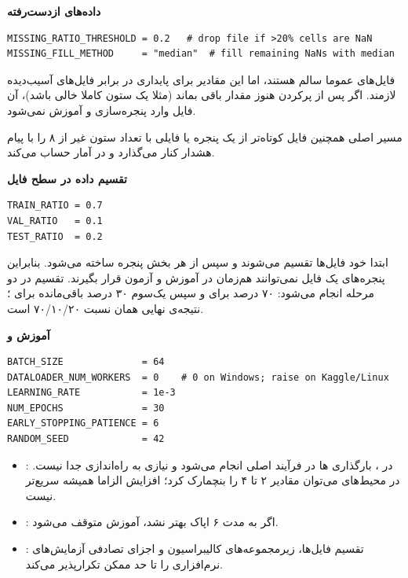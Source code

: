 \documentclass{article}
\newcommand{\mysubsection}[1]{
\par\vspace{0.5cm}
\noindent\textcolor{main_blue}{\large\textbf{#1}}
\par\vspace{0.2cm}
}
\begin{document}
\mysubsection{داده‌های ازدست‌رفته}

\begin{latin}
\begin{lstlisting}
MISSING_RATIO_THRESHOLD = 0.2   # drop file if >20% cells are NaN
MISSING_FILL_METHOD     = "median"  # fill remaining NaNs with median
\end{lstlisting}
\end{latin}

فایل‌های  عموما سالم هستند، اما این مقادیر برای پایداری در برابر فایل‌های آسیب‌دیده لازمند.
اگر پس از پرکردن هنوز مقدار  باقی بماند (مثلا یک ستون کاملا خالی باشد)،
آن فایل وارد پنجره‌سازی و آموزش نمی‌شود.

مسیر اصلی همچنین فایل کوتاه‌تر از یک پنجره یا فایلی با تعداد ستون غیر از ۸ را
با پیام هشدار کنار می‌گذارد و در آمار  حساب می‌کند.

\mysubsection{تقسیم داده در سطح فایل}

\begin{latin}
\begin{lstlisting}
TRAIN_RATIO = 0.7
VAL_RATIO   = 0.1
TEST_RATIO  = 0.2
\end{lstlisting}
\end{latin}

ابتدا خود فایل‌ها تقسیم می‌شوند و سپس از هر بخش پنجره ساخته می‌شود. بنابراین
پنجره‌های یک فایل نمی‌توانند هم‌زمان در آموزش و آزمون قرار بگیرند. تقسیم در دو
مرحله انجام می‌شود: ۷۰ درصد برای  و سپس یک‌سوم ۳۰ درصد باقی‌مانده
برای ؛ نتیجه‌ی نهایی همان نسبت ۷۰/۱۰/۲۰ است.

\mysubsection{آموزش و }

\begin{latin}
\begin{lstlisting}
BATCH_SIZE              = 64
DATALOADER_NUM_WORKERS  = 0    # 0 on Windows; raise on Kaggle/Linux
LEARNING_RATE           = 1e-3
NUM_EPOCHS              = 30
EARLY_STOPPING_PATIENCE = 6
RANDOM_SEED             = 42
\end{lstlisting}
\end{latin}

\begin{itemize}
\item {}: در ، بارگذاری ها در
فرآیند اصلی انجام می‌شود و نیازی به راه‌اندازی  جدا نیست. در محیط‌های 
می‌توان مقادیر ۲ تا ۴ را بنچمارک کرد؛ افزایش  الزاما همیشه سریع‌تر نیست.
\item {}: اگر  به مدت ۶ اپاک بهتر نشد، آموزش متوقف می‌شود.
\item {}: تقسیم فایل‌ها، زیرمجموعه‌های کالیبراسیون و اجزای
تصادفی آزمایش‌های نرم‌افزاری را تا حد ممکن تکرارپذیر می‌کند.
\end{itemize}
\end{document}
